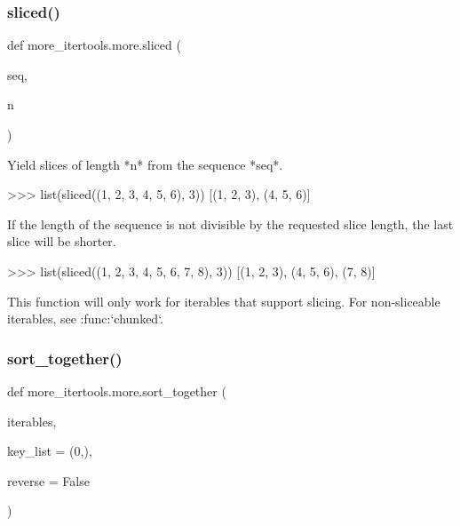 \subsubsection{\texorpdfstring{sliced()}{sliced()}}
{\footnotesize\ttfamily def more\+\_\+itertools.\+more.\+sliced (\begin{DoxyParamCaption}\item[{}]{seq,  }\item[{}]{n }\end{DoxyParamCaption})}

\begin{DoxyVerb}Yield slices of length *n* from the sequence *seq*.

    >>> list(sliced((1, 2, 3, 4, 5, 6), 3))
    [(1, 2, 3), (4, 5, 6)]

If the length of the sequence is not divisible by the requested slice
length, the last slice will be shorter.

    >>> list(sliced((1, 2, 3, 4, 5, 6, 7, 8), 3))
    [(1, 2, 3), (4, 5, 6), (7, 8)]

This function will only work for iterables that support slicing.
For non-sliceable iterables, see :func:`chunked`.\end{DoxyVerb}
 \mbox{\label{namespacemore__itertools_1_1more_a894ede945f23273a08f9d4a3a1a16c15}} 
\subsubsection{\texorpdfstring{sort\+\_\+together()}{sort\_together()}}
{\footnotesize\ttfamily def more\+\_\+itertools.\+more.\+sort\+\_\+together (\begin{DoxyParamCaption}\item[{}]{iterables,  }\item[{}]{key\+\_\+list = {\ttfamily (0,)},  }\item[{}]{reverse = {\ttfamily False} }\end{DoxyParamCaption})}

